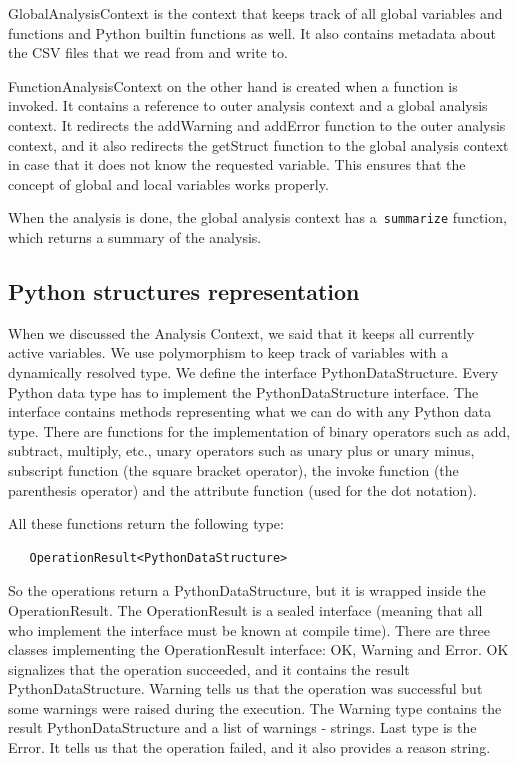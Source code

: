 GlobalAnalysisContext is the context that keeps track of all global variables and functions and Python builtin functions
as well.
It also contains metadata about the CSV files that we read from and write to.

FunctionAnalysisContext on the other hand is created when a function is invoked.
It contains a reference to outer analysis context and a global analysis context.
It redirects the addWarning and addError function to the outer analysis context, and it also redirects the getStruct
function to the global analysis context in case that it does not know the requested variable.
This ensures that the concept of global and local variables works properly.

When the analysis is done, the global analysis context has a~\verb|summarize| function, which returns a summary of the
analysis.

\subsection{Python structures representation}\label{subsec:python-structures-representation}

When we discussed the Analysis Context, we said that it keeps all currently active variables.
We use polymorphism to keep track of variables with a dynamically resolved type.
We define the interface PythonDataStructure.
Every Python data type has to implement the PythonDataStructure interface.
The interface contains methods representing what we can do with any Python data type.
There are functions for the implementation of binary operators such as add, subtract, multiply, etc., unary operators
such as unary plus or unary minus, subscript function (the square bracket operator), the invoke function
(the parenthesis operator) and the attribute function (used for the dot notation).

All these functions return the following type:
\begin{verbatim}
   OperationResult<PythonDataStructure>
\end{verbatim}
So the operations return a PythonDataStructure, but it is wrapped inside the OperationResult.
The OperationResult is a sealed interface (meaning that all who implement the interface must be known at compile time).
There are three classes implementing the OperationResult interface: OK, Warning and Error.
OK signalizes that the operation succeeded, and it contains the result PythonDataStructure.
Warning tells us that the operation was successful but some warnings were raised during the execution.
The Warning type contains the result PythonDataStructure and a list of warnings - strings.
Last type is the Error.
It tells us that the operation failed, and it also provides a reason string.

